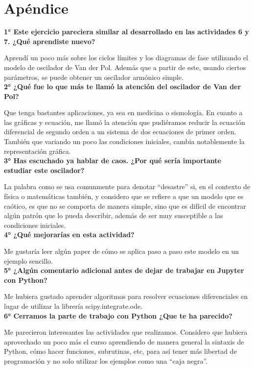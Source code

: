 \documentclass[a4paper]{article}
\begin{document}
\section{Apéndice}

\textbf{1° Este ejercicio pareciera similar al desarrollado en las actividades 6 y 7. ¿Qué aprendiste nuevo?}

Aprendí un poco más sobre los ciclos límites y los diagramas de fase utilizando el modelo de oscilador de Van der Pol. Además que a partir de este, usando ciertos parámetros, se puede obtener un oscilador armónico simple.\\

\textbf{2° ¿Qué fue lo que más te llamó la atención del oscilador de Van der Pol?}

Que tenga bastantes aplicaciones, ya sea en medicina o sismología. En cuanto a las gráficas y ecuación, me llamó la atención que pudiéramos reducir la ecuación diferencial de segundo orden a un sistema de dos ecuaciones de primer orden. También que variando un poco las condiciones iniciales, cambia notablemente la representación gráfica.\\

\textbf{3° Has escuchado ya hablar de caos. ¿Por qué sería importante estudiar este oscilador?}

La palabra como se usa comunmente para denotar “desastre” si, en el contexto de física o matemáticas también, y considero que se refiere a que un modelo que es caótico, es que no se comporta de manera simple, sino que es difícil de encontrar algún patrón que lo pueda describir, además de ser muy susceptible a las condiciones iniciales.\\

\textbf{4° ¿Qué mejorarías en esta actividad?}

Me gustaría leer algún paper de cómo se aplica paso a paso este modelo en un ejemplo sencillo.\\

\textbf{5° ¿Algún comentario adicional antes de dejar de trabajar en Jupyter con Python?}

Me hubiera gustado aprender algoritmos para resolver ecuaciones diferenciales en lugar de utilizar la librería scipy.integrate.ode.\\

\textbf{6° Cerramos la parte de trabajo con Python ¿Que te ha parecido?}

Me parecieron interesantes las actividades que realizamos. Considero que hubiera aprovechado un poco más el curso aprendiendo de manera general la sintaxis de Python, cómo hacer funciones, subrutinas, etc, para así tener más libertad de programación y no solo utilizar los ejemplos como una “caja negra”.
\end{document}
